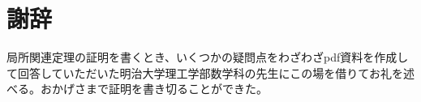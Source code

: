 \section*{謝辞}
局所関連定理の証明を書くとき、いくつかの疑問点をわざわざpdf資料を作成して回答していただいた明治大学理工学部数学科の先生にこの場を借りてお礼を述べる。おかげさまで証明を書き切ることができた。